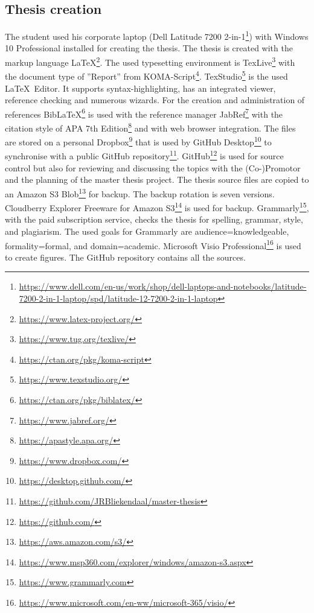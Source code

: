 \subsection{Thesis creation}
The student used his corporate laptop (Dell Latitude 7200 2-in-1\footnote{\url{https://www.dell.com/en-us/work/shop/dell-laptops-and-notebooks/latitude-7200-2-in-1-laptop/spd/latitude-12-7200-2-in-1-laptop}}) with Windows 10 Professional installed for creating the thesis. The thesis is created with the markup language \LaTeX\footnote{\url{https://www.latex-project.org/}}. The used typesetting environment is TexLive\footnote{\url{https://www.tug.org/texlive/}} with the document type of ''Report'' from KOMA-Script\footnote{\url{https://ctan.org/pkg/koma-script}}. TexStudio\footnote{\url{https://www.texstudio.org/}} is the used \LaTeX\ Editor. It supports syntax-highlighting, has an integrated viewer, reference checking and numerous wizards. For the creation and administration of references Bib\LaTeX\footnote{\url{https://ctan.org/pkg/biblatex/}} is used with the reference manager JabRef\footnote{\url{https://www.jabref.org/}} with the citation style of APA 7th Edition\footnote{\url{https://apastyle.apa.org/}} and with web browser integration. The files are stored on a personal Dropbox\footnote{\url{https://www.dropbox.com/}} that is used by GitHub Desktop\footnote{\url{https://desktop.github.com/}} to synchronise with a public GitHub repository\footnote{\url{https://github.com/JRBliekendaal/master-thesis}}. GitHub\footnote{\url{https://github.com/}} is used for source control but also for reviewing and discussing the topics with the (Co-)Promotor and the planning of the master thesis project. The thesis source files are copied to an Amazon S3 Blob\footnote{\url{https://aws.amazon.com/s3/}} for backup. The backup rotation is seven versions. Cloudberry Explorer Freeware for Amazon S3\footnote{\url{https://www.msp360.com/explorer/windows/amazon-s3.aspx}} is used for backup. Grammarly\footnote{\url{https://www.grammarly.com}}, with the paid subscription service, checks the thesis for spelling, grammar,  style, and plagiarism. The used goals for Grammarly are audience=knowledgeable, formality=formal, and domain=academic. Microsoft Visio Professional\footnote{\url{https://www.microsoft.com/en-ww/microsoft-365/visio/}} is used to create figures. The GitHub repository contains all the sources.
